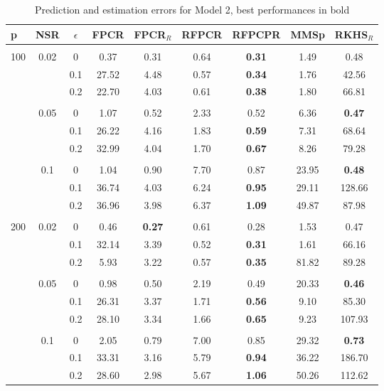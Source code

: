 \documentclass[11pt]{article}
\begin{document}
\begin{table}[ht!]
\vspace{0.5cm} 

\centering
{\small
\vspace{0.5cm} 
\begin{tabular}{l| c| c | c c c c c c}
p & NSR & $\epsilon$ & FPCR & FPCR$_R$ & RFPCR & RFPCPR & MMSp & RKHS$_R$     \\ \hline\hline  \\[-0.3cm]
\multirow{9}{*}{100} & \multirow{3}{*}{0.02} & 0 & 0.37 & 0.31 &   0.64 & \textbf{0.31} & 1.49 & 0.48 \\ 
& & 0.1 & 27.52 &   4.48 & 0.57 & \textbf{0.34} & 1.76 & 42.56 \\
& & 0.2 & 22.70	 & 4.03 & 0.61 & \textbf{0.38} & 1.80 & 66.81 \\\cline{2-9} \\[-0.3cm]
& \multirow{3}{*}{0.05} & 0 &  1.07  &  0.52 & 2.33   & 0.52 & 6.36 & \textbf{0.47}   \\
& & 0.1 & 26.22 & 4.16	  &  1.83 & \textbf{0.59} & 7.31 & 68.64 \\ 
& & 0.2 & 32.99  &  4.04 & 1.70 & \textbf{0.67} & 8.26 & 79.28  \\\cline{2-9} \\[-0.3cm]
& \multirow{3}{*}{0.1} & 0 &  1.04 & 0.90 & 7.70 & 0.87 & 23.95 & \textbf{0.48} \\  
& & 0.1 & 36.74 &  4.03 & 6.24 & \textbf{0.95} & 29.11 & 128.66 \\ 
& & 0.2 & 36.96 &  3.98 & 6.37 & \textbf{1.09} & 49.87 & 87.98  \\\cline{1-9} \\[-0.3cm]
\multirow{9}{*}{200} & \multirow{3}{*}{0.02} & 0 & 0.46 & \textbf{0.27} & 0.61 & 0.28 & 1.53 & 0.47 \\ 
& & 0.1 & 32.14 & 3.39 & 0.52 & \textbf{0.31} & 1.61 & 66.16  \\
& & 0.2 & 5.93 & 3.22 & 0.57 & \textbf{0.35} & 81.82 & 89.28 \\\cline{2-9} \\[-0.3cm]
& \multirow{3}{*}{0.05} & 0 & 0.98  &  0.50 & 2.19 & 0.49 & 20.33 &  \textbf{0.46} \\
& & 0.1 & 26.31 & 3.37 &  1.71 & \textbf{0.56}& 9.10 & 85.30 \\ 
& & 0.2 & 28.10 & 3.34 & 1.66 & \textbf{0.65} & 9.23 & 107.93 \\\cline{2-9} \\[-0.3cm]
& \multirow{3}{*}{0.1} & 0 &  2.05 & 0.79 & 7.00 & 0.85 & 29.32 & \textbf{0.73} \\  
& & 0.1 & 33.31 & 3.16 & 5.79 & \textbf{0.94} &	36.22 & 186.70		\\ 
& & 0.2 &  28.60 &  2.98 &  5.67 & \textbf{1.06} & 50.26 & 112.62 \\\cline{1-9}
\end{tabular}}
\caption{Prediction and estimation errors for Model 2, best performances in bold}
\end{table}
\end{document}

